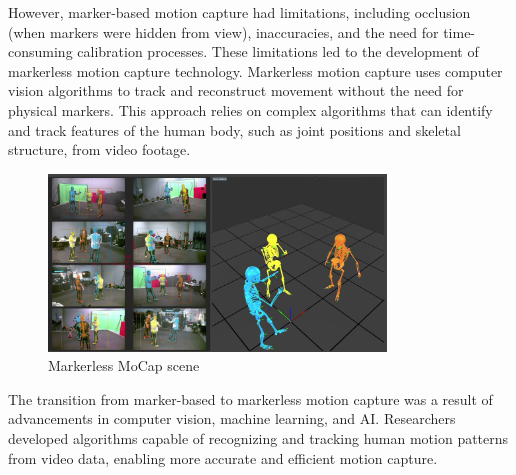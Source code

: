 However, marker-based motion capture had limitations, including occlusion 
(when markers were hidden from view), inaccuracies, and the need for time-consuming calibration processes. 
These limitations led to the development of markerless motion capture technology. 
Markerless motion capture uses computer vision algorithms to track and reconstruct movement without the need for physical markers. 
This approach relies on complex algorithms that can identify and track features of the human body, 
such as joint positions and skeletal structure, from video footage.
\begin{figure}[H]
    \centering
    \includegraphics[width=0.8\textwidth]{graphics/MoCapMarkerlessQualisys.png}
    \caption{Markerless MoCap scene}
    \label{fig:mocap}
\end{figure}

The transition from marker-based to markerless motion capture was a result of advancements in computer vision, machine learning, and AI. 
Researchers developed algorithms capable of recognizing and tracking human motion patterns from video data, 
enabling more accurate and efficient motion capture.

